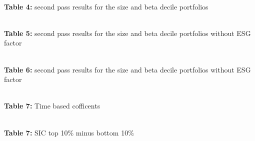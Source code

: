 \documentclass[12pt,oneside,reqno]{amsart}
\begin{document}
\begin{center}
    \paperspacingnarrow
    \\
    \textbf{Table 4:} second pass results for the size and beta decile portfolios\\
    \paperspacingwide
\end{center}


\begin{center}
    \paperspacingnarrow
    \\
    \textbf{Table 5:} second pass results for the size and beta decile portfolios without ESG factor\\
    \paperspacingwide
\end{center}


\begin{center}
    \paperspacingnarrow
    \\
    \textbf{Table 6:} second pass results for the size and beta decile portfolios without ESG factor\\
    \paperspacingwide
\end{center}


\begin{center}
    \paperspacingnarrow
    \\
    \textbf{Table 7:} Time based cofficents
    \paperspacingwide
\end{center}

\begin{center}
    \paperspacingnarrow
\\
\textbf{Table 7:} SIC top 10\% minus bottom 10\%
    \paperspacingwide
\end{center}
\clearpage
\restoregeometry


%
\end{document}
